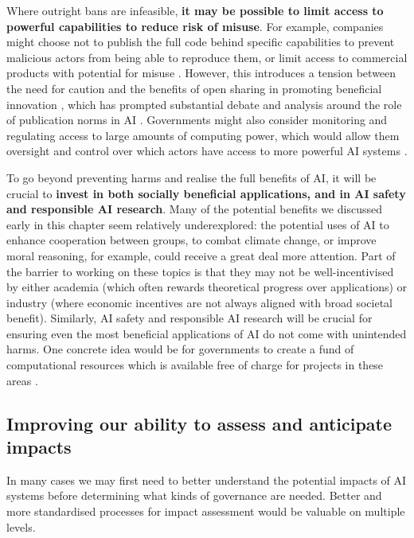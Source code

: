 \documentclass{article}
\begin{document}
Where outright bans are infeasible,\textbf{ it may be possible to limit access to powerful capabilities to reduce risk of misuse}. For example, companies might choose not to publish the full code behind specific capabilities to prevent malicious actors from being able to reproduce them, or limit access to commercial products with potential for misuse \citep{radford_better_2019}. However, this introduces a tension between the need for caution and the benefits of open sharing in promoting beneficial innovation \citep{whittlestone_tension_2020}, which has prompted substantial debate and analysis around the role of publication norms in AI \citep{gupta_report_2020}. Governments might also consider monitoring and regulating access to large amounts of computing power, which would allow them oversight and control over which actors have access to more powerful AI systems \citep{brundage_malicious_2018}.


To go beyond preventing harms and realise the full benefits of AI, it will be crucial to \textbf{invest in both socially beneficial applications, and in AI safety and responsible AI research}. Many of the potential benefits we discussed early in this chapter seem relatively underexplored: the potential uses of AI to enhance cooperation between groups, to combat climate change, or improve moral reasoning, for example, could receive a great deal more attention. Part of the barrier to working on these topics is that they may not be well-incentivised by either academia (which often rewards theoretical progress over applications) or industry (where economic incentives are not always aligned with broad societal benefit). Similarly, AI safety and responsible AI research will be crucial for ensuring even the most beneficial applications of AI do not come with unintended harms. One concrete idea would be for governments to create a fund of computational resources which is available free of charge for projects in these areas \citep{brundage_toward_2020}.

\subsection{Improving our ability to assess and anticipate impacts}

In many cases we may first need to better understand the potential impacts of AI systems before determining what kinds of governance are needed. Better and more standardised processes for impact assessment would be valuable on multiple levels.
\end{document}
